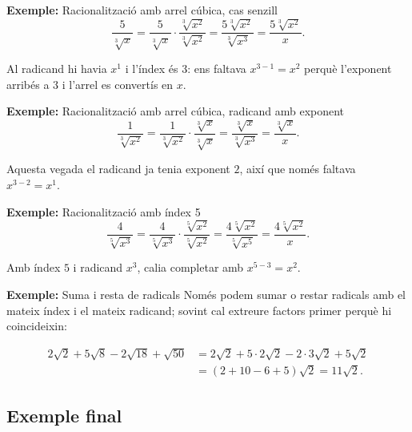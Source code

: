 \begin{exemple}{\textbf{Exemple:} Racionalització amb arrel cúbica, cas senzill}
\[
\frac{5}{\sqrt[3]{x}}
= \frac{5}{\sqrt[3]{x}} \cdot \frac{\sqrt[3]{x^{2}}}{\sqrt[3]{x^{2}}}
= \frac{5\sqrt[3]{x^{2}}}{\sqrt[3]{x^{3}}}
= \frac{5\sqrt[3]{x^{2}}}{x}.
\]

Al radicand hi havia $x^1$ i l'índex és $3$: ens faltava $x^{3-1}=x^2$ perquè l'exponent arribés a $3$ i l'arrel es convertís en $x$.
\end{exemple}

\begin{exemple}{\textbf{Exemple:} Racionalització amb arrel cúbica, radicand amb exponent}
\[
\frac{1}{\sqrt[3]{x^{2}}}
= \frac{1}{\sqrt[3]{x^{2}}} \cdot \frac{\sqrt[3]{x}}{\sqrt[3]{x}}
= \frac{\sqrt[3]{x}}{\sqrt[3]{x^{3}}}
= \frac{\sqrt[3]{x}}{x}.
\]

Aquesta vegada el radicand ja tenia exponent $2$, així que només faltava $x^{3-2}=x^1$.
\end{exemple}

\begin{exemple}{\textbf{Exemple:} Racionalització amb índex 5}
\[
\frac{4}{\sqrt[5]{x^{3}}}
= \frac{4}{\sqrt[5]{x^{3}}} \cdot \frac{\sqrt[5]{x^{2}}}{\sqrt[5]{x^{2}}}
= \frac{4\sqrt[5]{x^{2}}}{\sqrt[5]{x^{5}}}
= \frac{4\sqrt[5]{x^{2}}}{x}.
\]

Amb índex $5$ i radicand $x^3$, calia completar amb $x^{5-3}=x^2$.
\end{exemple}

\begin{exemple}{\textbf{Exemple:} Suma i resta de radicals}
Només podem sumar o restar radicals amb el mateix índex i el mateix radicand; sovint cal extreure factors primer perquè hi coincideixin:

\[
\begin{aligned}
2\sqrt{2} + 5\sqrt{8} - 2\sqrt{18} + \sqrt{50}
&= 2\sqrt{2} + 5\cdot 2\sqrt{2} - 2\cdot 3\sqrt{2} + 5\sqrt{2} \\
&= (2+10-6+5)\sqrt{2} = 11\sqrt{2}.
\end{aligned}
\]
\end{exemple}

\subsection{Exemple final}

